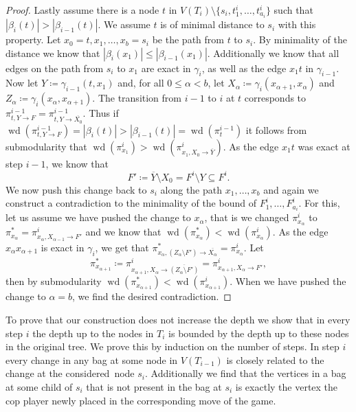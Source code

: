 \documentclass{lmcs}
\theoremstyle{plain}\newtheorem{claim}[thm]{Claim}   %
\DeclareMathOperator{\wid}{wd}
\newcommand{\ext}{\ensuremath{\rightarrow}}
\newcommand{\complementOf}[1]{\ensuremath{\overline{#1}}}
\newcommand{\complementOfB}[1]{\complementOf{#1}}
\newcommand{\considered}{considered}
\begin{document}
\begin{proof}
	Lastly assume there is a node $t$ in $V(T_i)\setminus\{s_i,t^i_1,\ldots,t^i_{a_i}\}$ such that $|\beta_i(t)|>|\beta_{i-1}(t)|$.
	We assume $t$ is of minimal distance to $s_i$ with this property.
	Let $x_0=t,x_1,\ldots,x_{b}=s_i$ be the path from $t$ to $s_i$.
	By minimality of the distance we know that $|\beta_i(x_1)|\leq |\beta_{i-1}(x_1)|$.
	Additionally we know that all edges on the path from $s_i$ to $x_1$ are exact in $\gamma_i$, as well as the edge $x_1t$ in $\gamma_{i-1}$.
	Now let $Y\coloneqq \gamma_{i-1}(t,x_1)$ and, for all $0\leq \alpha < b$, let $X_\alpha \coloneqq \gamma_i(x_{\alpha + 1},x_{\alpha})$ and $Z_\alpha \coloneqq \gamma_i(x_{\alpha},x_{\alpha + 1})$.
	The transition from $i-1$ to $i$ at $t$ corresponds to $\pi^{i-1}_{t,Y \ext F}=\pi^{i-1}_{t,Y \ext \complementOf{X_0}}$.
	Thus if $\wid(\pi^{i-1}_{t,Y \ext F})=|\beta_i(t)|>|\beta_{i-1}(t)|=\wid(\pi^{i-1}_{t})$ it follows from submodularity that $\wid(\pi^i_{x_1})>\wid(\pi^i_{x_1,X_0 \ext \complementOf{Y}})$.
	As the edge $x_1t$ was exact at step $i-1$, we know that  \[F'\coloneqq\complementOf{Y}\setminus X_0= F^i\setminus Y \subseteq F^i.\]
	We now push this change back to $s_i$ along the path $x_1,\ldots,x_b$ and again we construct a contradiction to the minimality of the bound of $F^i_1,\ldots,F^i_{a_i}$.
	For this, let us assume we have pushed the change to $x_\alpha$, that is we changed $\pi^i_{x_\alpha}$ to $\pi^*_{x_\alpha} = \pi^i_{x_\alpha,X_{\alpha - 1}\ext F'}$ and we know that $\wid(\pi^*_{x_\alpha})<\wid(\pi^{i}_{x_\alpha})$.
	As the edge $x_\alpha x_{\alpha+1}$ is exact in $\gamma_i$, we get that $\pi^*_{x_\alpha,(Z_\alpha \setminus F') \ext \complementOf{X_\alpha}} = \pi^i_{x_\alpha}$.
	Let \[\pi^*_{x_{\alpha+1}}\coloneqq \pi^i_{x_{\alpha+1},X_\alpha \ext \complementOfB{(Z_\alpha \setminus F')}} = \pi^i_{x_{\alpha+1},X_\alpha \ext F'},\] then by submodularity $\wid(\pi^*_{x_{\alpha+1}}) < \wid(\pi^i_{x_{\alpha+1}})$.
	When we have pushed the change to $\alpha=b$, we find the desired contradiction.
\end{proof}

To prove that our construction does not increase the depth we show that in every step $i$ the depth up to the nodes in $T_i$ is bounded by the depth up to these nodes in the original tree.
We prove this by induction on the number of steps.
In step $i$ every change in any bag at some node in $V(T_{i-1})$ is closely related to the change at the \considered\ node $s_i$.
Additionally we find that the vertices in a bag at some child of $s_i$ that is not present in the bag at $s_i$ is exactly the vertex the cop player newly placed in the corresponding move of the game.
\end{document}
